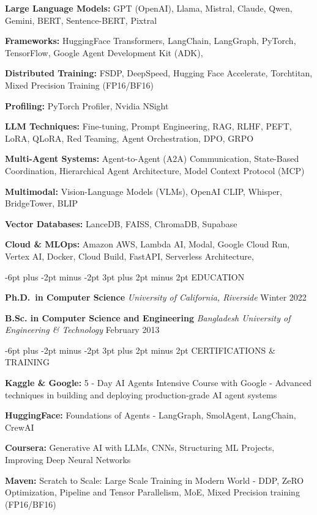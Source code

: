 \documentclass[10pt]{article}
\makeatletter
\providecommand{\tightlist}{%
  \setlength{\itemsep}{0pt}\setlength{\parskip}{0pt}}
\let\olditemize\itemize
\let\endolditemize\enditemize
\renewenvironment{itemize}{%
  \olditemize
  \setlength{\itemsep}{1pt}
  \setlength{\parskip}{0pt}
  \setlength{\parsep}{0pt}
  \setlength{\topsep}{2pt}
  \setlength{\partopsep}{0pt}
}{%
  \endolditemize
}
\renewcommand\subsection{\@startsection{subsection}{2}{\z@}%
  {-6pt plus -2pt minus -2pt}%
  {3pt plus 2pt minus 2pt}%
  {\normalfont\large\bfseries}}
\makeatother
\begin{document}
\begin{itemize}
\tightlist
\item
  \textbf{Large Language Models:} GPT (OpenAI), Llama, Mistral, Claude,
  Qwen, Gemini, BERT, Sentence-BERT, Pixtral
\item
  \textbf{Frameworks:} HuggingFace Transformers, LangChain, LangGraph,
  PyTorch, TensorFlow, Google Agent Development Kit (ADK),
\item
  \textbf{Distributed Training:} FSDP, DeepSpeed, Hugging Face Accelerate,
  Torchtitan, Mixed Precision Training (FP16/BF16)
\item
  \textbf{Profiling:} PyTorch Profiler, Nvidia NSight
\item
  \textbf{LLM Techniques:} Fine-tuning, Prompt Engineering, RAG, RLHF,
  PEFT, LoRA, QLoRA, Red Teaming, Agent Orchestration, DPO, GRPO
\item
  \textbf{Multi-Agent Systems:} Agent-to-Agent (A2A) Communication,
  State-Based Coordination, Hierarchical Agent Architecture, Model
  Context Protocol (MCP)
\item
  \textbf{Multimodal:} Vision-Language Models (VLMs), OpenAI CLIP,
  Whisper, BridgeTower, BLIP
\item
  \textbf{Vector Databases:} LanceDB, FAISS, ChromaDB, Supabase
\item
  \textbf{Cloud \& MLOps:} Amazon AWS, Lambda AI, Modal, Google Cloud
  Run, Vertex AI, Docker, Cloud Build, FastAPI, Serverless Architecture,
\end{itemize}

\subsection{EDUCATION}\label{education}

\textbf{Ph.D.~in Computer Science} \textbar{} \emph{University of
California, Riverside} \textbar{} Winter 2022

\textbf{B.Sc. in Computer Science and Engineering} \textbar{}
\emph{Bangladesh University of Engineering \& Technology} \textbar{}
February 2013

\subsection{CERTIFICATIONS \& TRAINING}\label{certifications-training}

\begin{itemize}
\tightlist
\item
  \textbf{Kaggle \& Google:} 5 - Day AI Agents Intensive Course with Google - Advanced techniques in building and deploying production-grade AI agent systems
\item
  \textbf{HuggingFace:} Foundations of Agents - LangGraph, SmolAgent,
  LangChain, CrewAI
\item
  \textbf{Coursera:} Generative AI with LLMs, CNNs, Structuring ML
  Projects, Improving Deep Neural Networks
\item
  \textbf{Maven:} Scratch to Scale: Large Scale Training in Modern World
  - DDP, ZeRO Optimization, Pipeline and Tensor Parallelism, MoE, Mixed
  Precision training (FP16/BF16)
\end{itemize}
\end{document}
